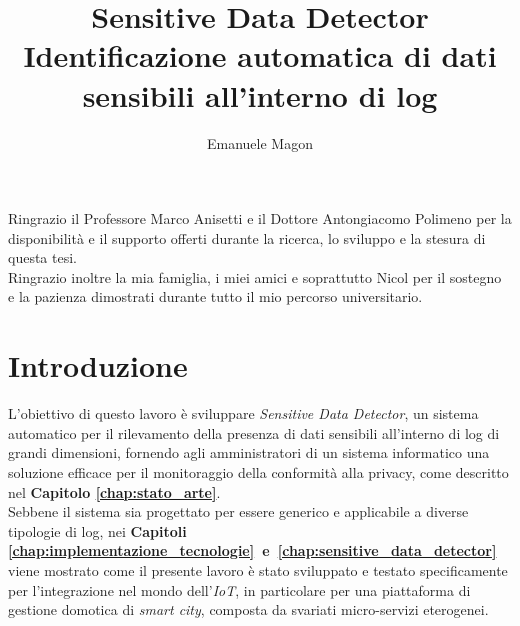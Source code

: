 \documentclass[12pt,twoside]{report}
\title{Sensitive Data Detector Identificazione automatica di dati sensibili all'interno di log}
\author{Emanuele Magon}
\begin{document}
\makecenteredfrontpage

%
%


%
%


Ringrazio il Professore Marco Anisetti e il Dottore Antongiacomo Polimeno per la disponibilità e il supporto offerti durante la ricerca, lo sviluppo e la stesura di questa tesi. \\
Ringrazio inoltre la mia famiglia, i miei amici e soprattutto Nicol per il sostegno e la pazienza dimostrati durante tutto il mio percorso universitario.

%
%

\afterpreface



%
%

\cleardoublepage
\chapter{Introduzione}
\label{chap:introduzione}

L'obiettivo di questo lavoro è sviluppare \textit{Sensitive Data Detector}, un sistema automatico per il rilevamento della presenza di dati sensibili all'interno di log di grandi dimensioni, fornendo agli amministratori di un sistema informatico una soluzione efficace per il monitoraggio della conformità alla privacy, come descritto nel \textbf{Capitolo \ref{chap:stato_arte}}.\\
Sebbene il sistema sia progettato per essere generico e applicabile a diverse tipologie di log, nei \textbf{Capitoli \ref{chap:implementazione_tecnologie}~e~\ref{chap:sensitive_data_detector}} viene mostrato come il presente lavoro è stato sviluppato e testato specificamente per l'integrazione nel mondo dell'\textit{IoT}, in particolare per una piattaforma di gestione domotica di \textit{smart city}, composta da svariati micro-servizi eterogenei.
\end{document}
